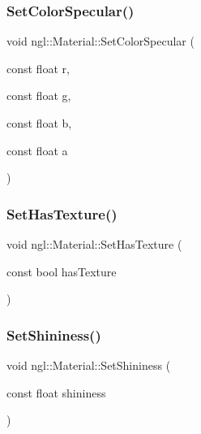 \mbox{\label{classngl_1_1_material_a3915a8e436cb8231ac44f8368a7a8013}} 
\subsubsection{\texorpdfstring{Set\+Color\+Specular()}{SetColorSpecular()}\hspace{0.1cm}{\footnotesize\ttfamily [2/2]}}
{\footnotesize\ttfamily void ngl\+::\+Material\+::\+Set\+Color\+Specular (\begin{DoxyParamCaption}\item[{const float}]{r,  }\item[{const float}]{g,  }\item[{const float}]{b,  }\item[{const float}]{a }\end{DoxyParamCaption})}

\mbox{\label{classngl_1_1_material_a2d82dd4a9fd64d43c49fb1f28eff369c}} 
\subsubsection{\texorpdfstring{Set\+Has\+Texture()}{SetHasTexture()}}
{\footnotesize\ttfamily void ngl\+::\+Material\+::\+Set\+Has\+Texture (\begin{DoxyParamCaption}\item[{const bool}]{has\+Texture }\end{DoxyParamCaption})}

\mbox{\label{classngl_1_1_material_a45ac582dba49a57f1824145fb80d472b}} 
\subsubsection{\texorpdfstring{Set\+Shininess()}{SetShininess()}}
{\footnotesize\ttfamily void ngl\+::\+Material\+::\+Set\+Shininess (\begin{DoxyParamCaption}\item[{const float}]{shininess }\end{DoxyParamCaption})}



